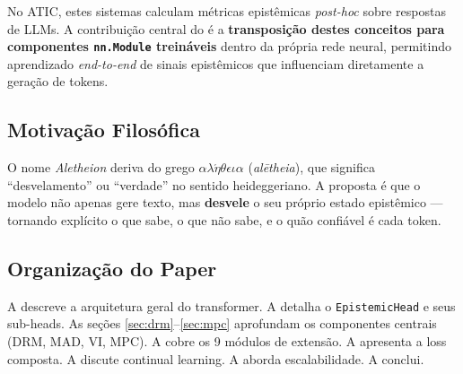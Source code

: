No ATIC, estes sistemas calculam m\'etricas epist\^emicas \textit{post-hoc}
sobre respostas de LLMs. A contribui\c{c}\~ao central do \aletheion{} \'e a
\textbf{transposi\c{c}\~ao destes conceitos para componentes \texttt{nn.Module}
trein\'aveis} dentro da pr\'opria rede neural, permitindo aprendizado
\textit{end-to-end} de sinais epist\^emicos que influenciam diretamente a
gera\c{c}\~ao de tokens.

\subsection{Motiva\c{c}\~ao Filos\'ofica}

O nome \textit{Aletheion} deriva do grego $\alpha\lambda\acute{\eta}\theta\epsilon\iota\alpha$
(\textit{al\=etheia}), que significa ``desvelamento'' ou ``verdade'' no sentido
heideggeriano. A proposta \'e que o modelo n\~ao apenas gere texto, mas
\textbf{desvele} o seu pr\'oprio estado epist\^emico --- tornando expl\'icito
o que sabe, o que n\~ao sabe, e o qu\~ao confi\'avel \'e cada token.

\subsection{Organiza\c{c}\~ao do Paper}

A  descreve a arquitetura geral do transformer.
A  detalha o \texttt{EpistemicHead} e seus sub-heads.
As se\c{c}\~oes \ref{sec:drm}--\ref{sec:mpc} aprofundam os componentes centrais
(DRM, MAD, VI, MPC). A  cobre os 9 m\'odulos de extens\~ao.
A  apresenta a loss composta. A  discute
continual learning. A  aborda escalabilidade.
A  conclui.
